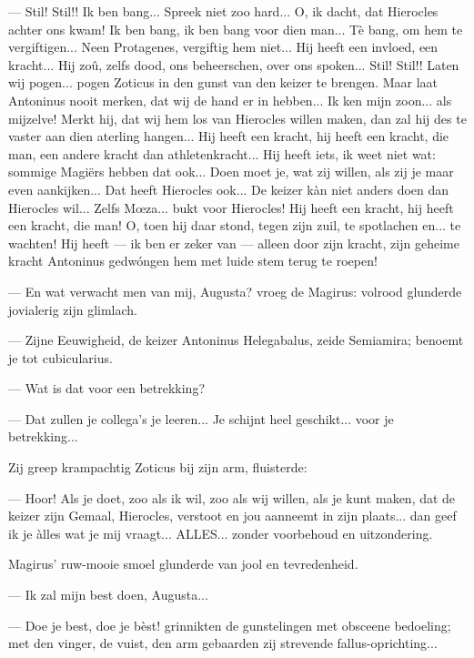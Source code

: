 \documentclass[a4paper, 12pt, oneside, dutch]{article}
\begin{document}
--- Stil! Stil!! Ik ben bang... Spreek niet zoo hard... O, ik dacht, dat Hierocles achter ons kwam! Ik ben bang, ik ben bang voor dien man... Tè bang, om hem te vergiftigen... Neen Protagenes, vergiftig hem niet... Hij heeft een invloed, een kracht... Hij zoû, zelfs dood, ons beheerschen, over ons spoken... Stil! Stil!! Laten wij pogen... pogen Zoticus in den gunst van den keizer te brengen. Maar laat Antoninus nooit merken, dat wij de hand er in hebben... Ik ken mijn zoon... als mijzelve! Merkt hij, dat wij hem los van Hierocles willen maken, dan zal hij des te vaster aan dien aterling hangen... Hij heeft een kracht, hij heeft een kracht, die man, een andere kracht dan athletenkracht... Hij heeft iets, ik weet niet wat: sommige Magiërs hebben dat ook... Doen moet je, wat zij willen, als zij je maar even aankijken... Dat heeft Hierocles ook... De keizer kàn niet anders doen dan Hierocles wil... Zelfs Mœza... bukt voor Hierocles! Hij heeft een kracht, hij heeft een kracht, die man! O, toen hij daar stond, tegen zijn zuil, te spotlachen en... te wachten! Hij heeft --- ik ben er zeker van --- alleen door zijn kracht, zijn geheime kracht Antoninus gedwóngen hem met luide stem terug te roepen!

--- En wat verwacht men van mij, Augusta? vroeg de Magirus: volrood glunderde jovialerig zijn glimlach.

--- Zijne Eeuwigheid, de keizer Antoninus Helegabalus, zeide Semiamira; benoemt je tot cubicularius.

--- Wat is dat voor een betrekking?

--- Dat zullen je collega's je leeren... Je schijnt heel geschikt... voor je betrekking...

Zij greep krampachtig Zoticus bij zijn arm, fluisterde:

--- Hoor! Als je doet, zoo als ik wil, zoo als wij willen, als je kunt maken, dat de keizer zijn Gemaal, Hierocles, verstoot en jou aanneemt in zijn plaats... dan geef ik je àlles wat je mij vraagt... ALLES... zonder voorbehoud en uitzondering.

Magirus' ruw-mooie smoel glunderde van jool en tevredenheid.

--- Ik zal mijn best doen, Augusta...

--- Doe je best, doe je bèst! grinnikten de gunstelingen met obsceene bedoeling; met den vinger, de vuist, den arm gebaarden zij strevende fallus-oprichting...
\end{document}
